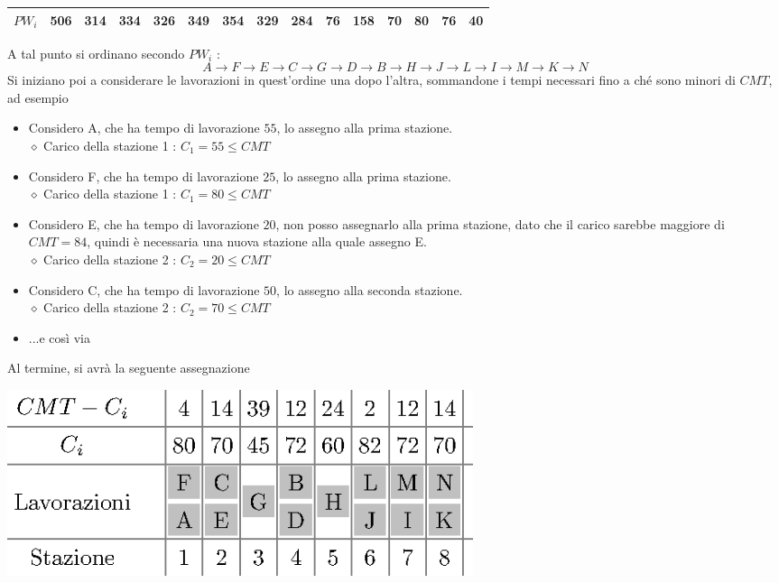 \documentclass[10pt, letterpaper]{report}
\begin{document}
\begin{center}
\begin{tabular}{|c|c|c|c|c|c|c|c|c|c|c|c|c|c|c|}
        $PW_i$      & 506                                                       & 314                                                   & 334                                                   & 326                                                   & 349                                                      & 354                                                      & 329                                                  & 284    & 76 & 158                                               & 70 & 80 & 76 & 40 \\ \hline
        \end{tabular}
\end{center}
A tal punto si ordinano secondo $PW_i$ : $$A\rightarrow F \rightarrow  E \rightarrow  C \rightarrow  G 
\rightarrow D \rightarrow  B \rightarrow  H \rightarrow  J \rightarrow  L 
\rightarrow  I \rightarrow  M \rightarrow  K \rightarrow  N $$
Si iniziano poi a considerare le lavorazioni in quest'ordine una dopo l'altra, sommandone i tempi necessari fino 
a ché sono minori di $CMT$, ad esempio 
\begin{itemize}
    \item Considero A, che ha tempo di lavorazione $55$, lo assegno alla prima stazione. \\$\diamond $ Carico della stazione 1 : $C_1=55\le CMT$
    \item Considero F, che ha tempo di lavorazione $25$, lo assegno alla prima stazione. \\$\diamond $ Carico della stazione 1 : $C_1=80\le CMT$
    \item Considero E, che ha tempo di lavorazione $20$, non posso assegnarlo alla prima stazione, dato che il carico sarebbe 
    maggiore di $CMT=84$, quindi è necessaria una nuova stazione alla quale assegno E. \\$\diamond $ Carico della stazione 2 : $C_2=20\le CMT$
    \item Considero C, che ha tempo di lavorazione $50$, lo assegno alla seconda stazione. \\$\diamond $ Carico della stazione 2 : $C_2=70\le CMT$
    \item ...e così via
\end{itemize}
Al termine, si avrà la seguente assegnazione\begin{center}
    \includegraphics[width=0.6\textwidth ]{images/bilanciamentoLineaEs.eps}
\end{center}
\end{document}
